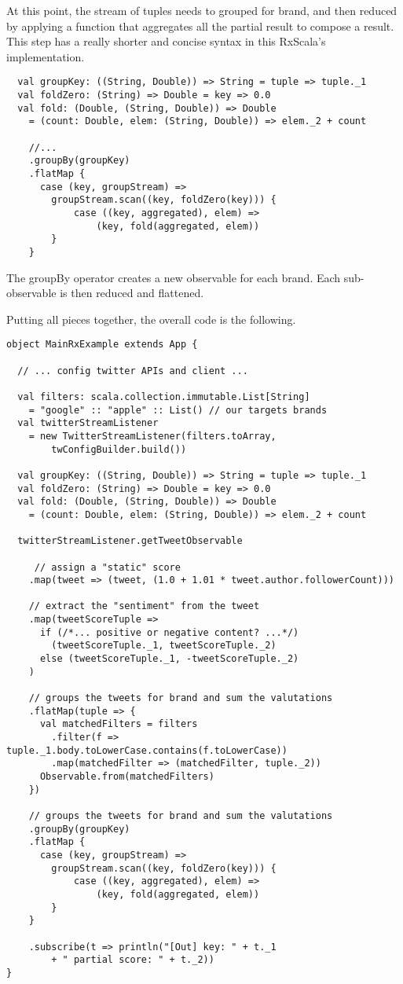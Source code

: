 At this point, the stream of tuples needs to grouped for brand, and then
reduced by applying a function that aggregates all the partial result to
compose a result. This step has a really shorter and concise syntax in
this RxScala's implementation.

\begin{verbatim}
  val groupKey: ((String, Double)) => String = tuple => tuple._1
  val foldZero: (String) => Double = key => 0.0
  val fold: (Double, (String, Double)) => Double
    = (count: Double, elem: (String, Double)) => elem._2 + count

    //...
    .groupBy(groupKey)
    .flatMap {
      case (key, groupStream) =>
        groupStream.scan((key, foldZero(key))) {
            case ((key, aggregated), elem) =>
                (key, fold(aggregated, elem))
        }
    }
\end{verbatim}

The groupBy operator creates a new observable for each brand. Each
sub-observable is then reduced and flattened.

Putting all pieces together, the overall code is the following.

\begin{verbatim}
object MainRxExample extends App {

  // ... config twitter APIs and client ...

  val filters: scala.collection.immutable.List[String]
    = "google" :: "apple" :: List() // our targets brands
  val twitterStreamListener
    = new TwitterStreamListener(filters.toArray, 
    	twConfigBuilder.build())

  val groupKey: ((String, Double)) => String = tuple => tuple._1
  val foldZero: (String) => Double = key => 0.0
  val fold: (Double, (String, Double)) => Double
    = (count: Double, elem: (String, Double)) => elem._2 + count

  twitterStreamListener.getTweetObservable

     // assign a "static" score
    .map(tweet => (tweet, (1.0 + 1.01 * tweet.author.followerCount)))

    // extract the "sentiment" from the tweet
    .map(tweetScoreTuple =>
      if (/*... positive or negative content? ...*/)
        (tweetScoreTuple._1, tweetScoreTuple._2)
      else (tweetScoreTuple._1, -tweetScoreTuple._2)
    )

    // groups the tweets for brand and sum the valutations
    .flatMap(tuple => {
      val matchedFilters = filters
        .filter(f => tuple._1.body.toLowerCase.contains(f.toLowerCase))
        .map(matchedFilter => (matchedFilter, tuple._2))
      Observable.from(matchedFilters)
    })

    // groups the tweets for brand and sum the valutations
    .groupBy(groupKey)
    .flatMap {
      case (key, groupStream) =>
        groupStream.scan((key, foldZero(key))) {
            case ((key, aggregated), elem) =>
                (key, fold(aggregated, elem))
        }
    }

    .subscribe(t => println("[Out] key: " + t._1
        + " partial score: " + t._2))
}
\end{verbatim}


